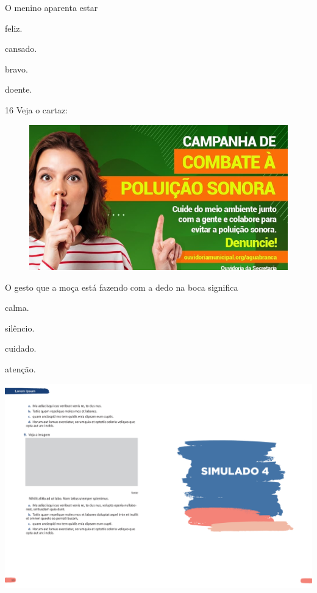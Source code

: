 O menino aparenta estar

\begin{escolha}
\item feliz.

\item cansado.

\item bravo.

\item doente.
\end{escolha}

\num{16} Veja o cartaz:

\begin{figure}[htpb!]
\centering
\includegraphics[width=.5\textwidth]{media/image173.png}
\end{figure}


O gesto que a moça está fazendo com a dedo na boca significa

\begin{escolha}
\item calma.

\item silêncio.

\item cuidado.

\item atenção.
\end{escolha}


\vspace*{-3.4cm}
\hspace*{-3.7cm}\includegraphics[scale=1]{../watermarks/4simulado5ano.pdf}

